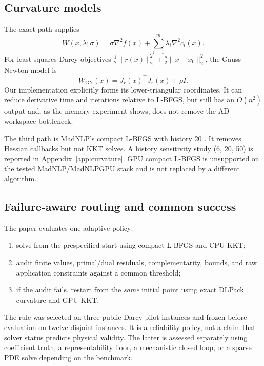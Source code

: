 \subsection{Curvature models}

The exact path supplies
\begin{equation}
W(x,\lambda;\sigma)=
\sigma\nabla^2 f(x)+\sum_{i=1}^{m}\lambda_i\nabla^2 c_i(x).
\label{eq:exacthessian}
\end{equation}
For least-squares Darcy objectives
$\frac{1}{2}\|r(x)\|_2^2+\frac{\rho}{2}\|x-x_0\|_2^2$, the
Gauss--Newton model is
\begin{equation}
W_{\mathrm{GN}}(x)=J_r(x)^\top J_r(x)+\rho I.
\label{eq:gn}
\end{equation}
Our implementation explicitly forms its lower-triangular coordinates.  It can
reduce derivative time and iterations relative to L-BFGS, but still has an
$O(n^2)$ output and, as the memory experiment shows, does not remove the AD
workspace bottleneck.

The third path is MadNLP's compact L-BFGS with history 20
\citep{liu1989lbfgs}.  It removes Hessian callbacks but not KKT solves.  A
history sensitivity study (6, 20, 50) is reported in
Appendix~\ref{app:curvature}.  GPU compact L-BFGS is unsupported on the tested
MadNLP/MadNLPGPU stack and is not replaced by a different algorithm.

\subsection{Failure-aware routing and common success}

The paper evaluates one adaptive policy:

\begin{enumerate}
  \item solve from the prespecified start using compact L-BFGS and CPU KKT;
  \item audit finite values, primal/dual residuals, complementarity, bounds,
  and raw application constraints against a common threshold;
  \item if the audit fails, restart from the \emph{same} initial point using
  exact DLPack curvature and GPU KKT.
\end{enumerate}

The rule was selected on three public-Darcy pilot instances and frozen before
evaluation on twelve disjoint instances.  It is a reliability policy, not a
claim that solver status predicts physical validity.  The latter is assessed
separately using coefficient truth, a representability floor, a mechanistic
closed loop, or a sparse PDE solve depending on the benchmark.
